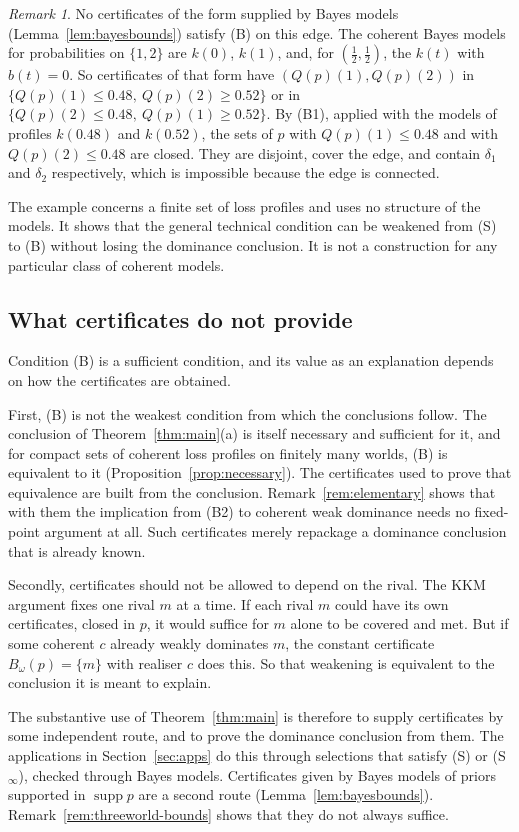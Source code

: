 \documentclass[11pt]{article}
\theoremstyle{definition}
\theoremstyle{remark}
\newtheorem{remark}[theorem]{Remark}
\newcommand{\supp}{\operatorname{supp}}
\begin{document}
\begin{remark}
No certificates of the form supplied by Bayes models (Lemma~\ref{lem:bayesbounds}) satisfy (B) on this edge. The coherent Bayes models for probabilities on $\{1,2\}$ are $k(0)$, $k(1)$, and, for $(\tfrac12,\tfrac12)$, the $k(t)$ with $b(t)=0$. So certificates of that form have $(Q(p)(1),Q(p)(2))$ in $\{Q(p)(1)\le0.48,\ Q(p)(2)\ge0.52\}$ or in $\{Q(p)(2)\le0.48,\ Q(p)(1)\ge0.52\}$. By (B1), applied with the models of profiles $k(0.48)$ and $k(0.52)$, the sets of $p$ with $Q(p)(1)\le0.48$ and with $Q(p)(2)\le0.48$ are closed. They are disjoint, cover the edge, and contain $\delta_1$ and $\delta_2$ respectively, which is impossible because the edge is connected.
\end{remark}

The example concerns a finite set of loss profiles and uses no structure of the models. It shows that the general technical condition can be weakened from (S) to (B) without losing the dominance conclusion. It is not a construction for any particular class of coherent models.

\subsection{What certificates do not provide}\label{sec:limits}
Condition (B) is a sufficient condition, and its value as an explanation depends on how the certificates are obtained.

First, (B) is not the weakest condition from which the conclusions follow. The conclusion of Theorem~\ref{thm:main}(a) is itself necessary and sufficient for it, and for compact sets of coherent loss profiles on finitely many worlds, (B) is equivalent to it (Proposition~\ref{prop:necessary}). The certificates used to prove that equivalence are built from the conclusion. Remark~\ref{rem:elementary} shows that with them the implication from (B2) to coherent weak dominance needs no fixed-point argument at all. Such certificates merely repackage a dominance conclusion that is already known.

Secondly, certificates should not be allowed to depend on the rival. The KKM argument fixes one rival $m$ at a time. If each rival $m$ could have its own certificates, closed in $p$, it would suffice for $m$ alone to be covered and met. But if some coherent $c$ already weakly dominates $m$, the constant certificate $B_\omega(p)=\{m\}$ with realiser $c$ does this. So that weakening is equivalent to the conclusion it is meant to explain.

The substantive use of Theorem~\ref{thm:main} is therefore to supply certificates by some independent route, and to prove the dominance conclusion from them. The applications in Section~\ref{sec:apps} do this through selections that satisfy (S) or (S$_\infty$), checked through Bayes models. Certificates given by Bayes models of priors supported in $\supp p$ are a second route (Lemma~\ref{lem:bayesbounds}). Remark~\ref{rem:threeworld-bounds} shows that they do not always suffice.
\end{document}
